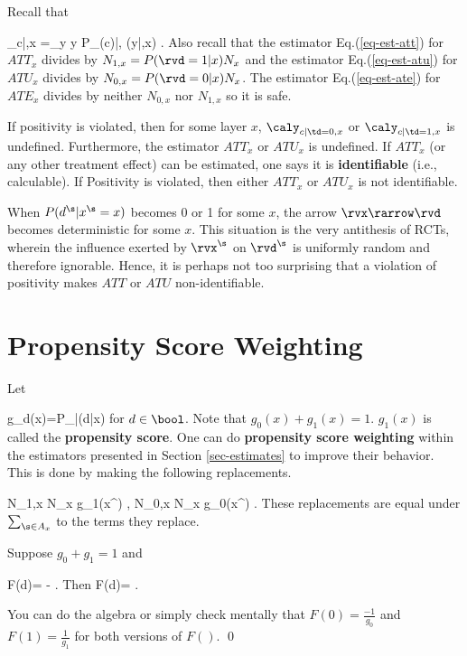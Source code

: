 Recall that

\beq
\caly_{c|\td ,x}
=\sum_{y} y P_{\rvy(c)|\rvtd, \rvx}(y|\td,x)
\;.
\eeq
Also recall
that the estimator
Eq.(\ref{eq-est-att})
for $ATT_x$ divides by $N_{1,x}=P(\rvd=1|x)N_x$
and
the estimator
Eq.(\ref{eq-est-atu})
for $ATU_x$ divides by $N_{0,x}= P(\rvd=0|x)N_x$.
The estimator Eq.(\ref{eq-est-ate})
for $ATE_x$ divides by neither $N_{0,x}$
nor $N_{1,x}$ so it is safe.

If positivity is violated,
then
for some
layer $x$,
 $\caly_{c|\td =0,x}$ or $\caly_{c|\td =1,x}$
is undefined.
Furthermore,  the estimator
$ATT_x$ or $ATU_x$ is undefined.
If $ATT_x$ (or any
other treatment effect)  can be estimated,
one says it is {\bf identifiable} (i.e.,
calculable). If Positivity is violated, then
either $ATT_x$ or $ATU_x$ is not identifiable.



When
$P(d^\s|x^\s=x)$
becomes 0 or 1 for some $x$,
the arrow
$\rvx\rarrow\rvd$
becomes deterministic
for some $x$.
This situation
is
the very
antithesis
of RCTs,
wherein
the influence
exerted by $\rvx^\s$ on
$\rvd^\s$ is uniformly
random and therefore ignorable.
Hence, it is perhaps
not too surprising
that a violation
of positivity makes
$ATT$ or $ATU$
non-identifiable.

\section{Propensity Score
Weighting}

Let

\beq
g_d(x)=P_{\rvd|\rvx}(d|x)
\eeq
 for $d\in\bool$.
Note that $g_0(x)+g_1(x)=1$.
$g_1(x)$ is called the {\bf propensity score}.
One can do {\bf propensity score weighting}
within the estimators
presented in Section
\ref{sec-estimates} to
improve their behavior.
This is done by making the
following replacements.

\beq
N_{1,x}
\rarrow
N_x g_1(x^\s)
\;,\;\;
N_{0,x}
\rarrow
N_x g_0(x^\s)
\;.
\eeq
These replacements are
equal under $ \sum_{\s\in A_x}$
to the terms they replace.

\begin{claim}
\label{cl-d-line}
Suppose $g_0+g_1=1$ and

\beq F(d)=
-
\;.
\eeq
Then
\beq
F(d)=
\;.
\eeq
\end{claim}
\proof
You can do the algebra
or simply check mentally that
$F(0)=\frac{-1}{g_0}$
and $F(1)=\frac{1}{g_1}$
for both versions of $F()$.
\qed

